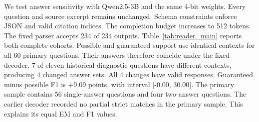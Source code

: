 We test answer sensitivity with Qwen2.5-3B and the same 4-bit weights. Every question and source excerpt remains unchanged. Schema constraints enforce JSON and valid citation indices. The completion budget increases to 512 tokens. The fixed parser accepts 234 of 234 outputs. Table~\ref{tab:reader_main} reports both complete cohorts. Possible and guaranteed support use identical contexts for all 60 primary questions. Their answers therefore coincide under the fixed decoder. 7 of eleven historical diagnostic questions have different contexts, producing 4 changed answer sets. All 4 changes have valid responses. Guaranteed minus possible F1 is +9.09 points, with interval [-0.00, 30.00]. The primary sample contains 56 single-answer questions and four two-answer questions. The earlier decoder recorded no partial strict matches in the primary sample. This explains its equal EM and F1 values.
